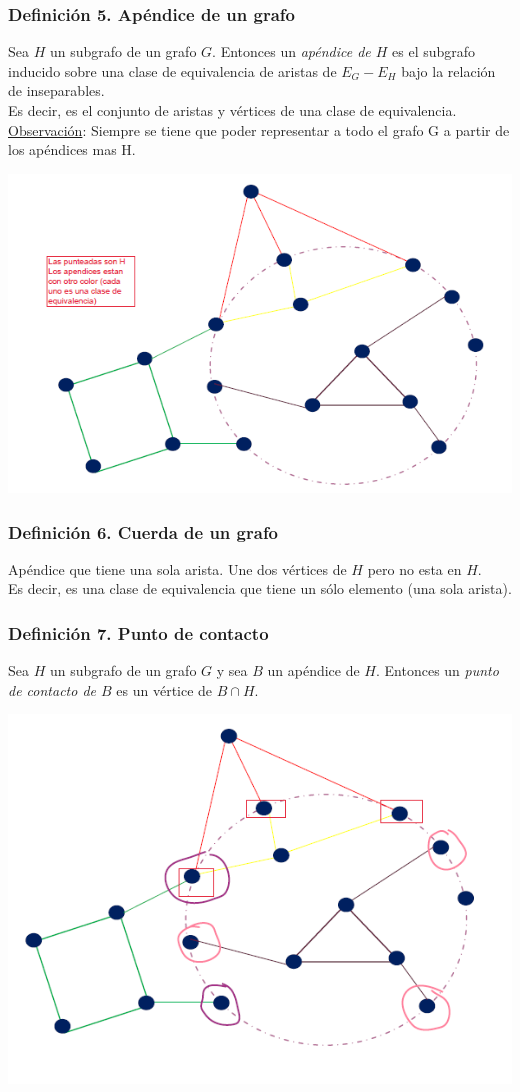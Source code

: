 \documentclass{article}
\begin{document}
\subsubsection*{Definición 5. Apéndice de un grafo}
Sea $H$ un subgrafo de un grafo $G$. Entonces un \emph{apéndice de $H$} es el subgrafo inducido sobre una clase de equivalencia de 
aristas de $E_G -E_H$ bajo la relación de inseparables.
\\Es decir, es el conjunto de aristas y vértices de una clase de equivalencia.
\\\underline{Observación}: Siempre se tiene que poder representar a todo el grafo G a partir de los apéndices mas H.
\begin{center}
    \includegraphics[width=.70\textwidth]{apendicesClasesEquiv.PNG}
\end{center}

\subsubsection*{Definición 6. Cuerda de un grafo}
Apéndice que tiene una sola arista. Une dos vértices de $H$ pero no esta en $H$.
\\Es decir, es una clase de equivalencia que tiene un sólo elemento (una sola arista).

\subsubsection*{Definición 7. Punto de contacto}
Sea $H$ un subgrafo de un grafo $G$ y sea $B$ un apéndice de $H$. Entonces un \emph{punto de contacto de $B$} es un vértice de $B \cap H$.
\begin{center}
    \includegraphics[width=.40\textwidth]{apendicesPtosContacto.PNG}
\end{center}
\end{document}
